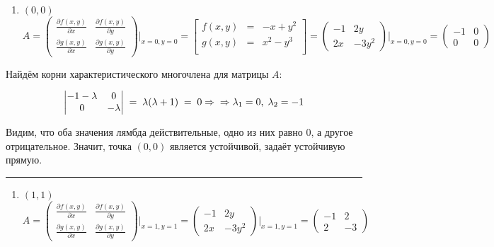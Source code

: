 \documentclass[11pt]{article}
\providecommand{\tightlist}{%
      \setlength{\itemsep}{0pt}\setlength{\parskip}{0pt}}
\begin{document}
\begin{enumerate}
\def\labelenumi{\arabic{enumi}.}
\tightlist
\item
  \((0, 0)\) \[
  A=
  \begin{pmatrix}
  \frac{\partial f(x, y)}{\partial x} & \frac{\partial f(x, y)}{\partial y}\\
  \frac{\partial g(x, y)}{\partial x} & \frac{\partial g(x, y)}{\partial y}
  \end{pmatrix}\Bigg|_{x=0,y=0}
  =
  \left[
    \begin{array}{ccc}
    f(x,y) &=& -x+y^2\\
    g(x,y) &=& x^2-y^3 \\
    \end{array}
  \right]
  =
  \begin{pmatrix}
  -1 & 2y\\
  2x & -3y^2
  \end{pmatrix}\Bigg|_{x=0,y=0}
  =
  \begin{pmatrix}
  -1 & 0\\
   0 & 0
  \end{pmatrix}
  \]
\end{enumerate}

Найдём корни характеристического многочлена для матрицы \(A\):

\[
\begin{vmatrix}
-1-\lambda & 0\\
 0 & -\lambda
\end{vmatrix}
\; = \;
\lambda(\lambda+1) \; = \;0
\Rightarrow\\
\Rightarrow
  \lambda_{1}=0, \; \lambda_{2}=-1
\]

Видим, что оба значения лямбда действительные, одно из них равно \(0\),
а другое отрицательное. Значит, точка \((0,0)\) является устойчивой,
задаёт устойчивую прямую.

\begin{center}\rule{0.5\linewidth}{0.5pt}\end{center}

\begin{enumerate}
\def\labelenumi{\arabic{enumi}.}
\setcounter{enumi}{1}
\tightlist
\item
  \((1,1)\) \[
  A=
  \begin{pmatrix}
  \frac{\partial f(x, y)}{\partial x} & \frac{\partial f(x, y)}{\partial y}\\
  \frac{\partial g(x, y)}{\partial x} & \frac{\partial g(x, y)}{\partial y}
  \end{pmatrix}\Bigg|_{x=1,y=1}
  =
  \begin{pmatrix}
  -1 & 2y\\
  2x & -3y^2
  \end{pmatrix}\Bigg|_{x=1,y=1}
  =
  \begin{pmatrix}
  -1 & 2\\
   2 & -3
  \end{pmatrix}
  \]
\end{enumerate}
\end{document}
